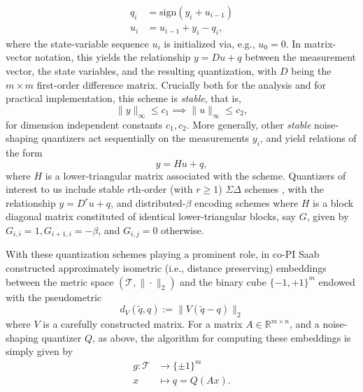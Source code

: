 \documentclass{article}
\newcommand{\R}{\mathbb{R}}
\newcommand{\sign}{\mathrm{sign}}
\begin{document}
\begin{align}
    q_i &= \sign(y_i+u_{i-1})\\
    u_i &= u_{i-1} + y_i -q_i,
\end{align}
where the state-variable sequence $u_i$ is initialized via, e.g., $u_0=0$. In matrix-vector notation, this yields the relationship $y=Du+q$  between the measurement vector, the state variables, and the resulting quantization, with $D$ being the $m\times m$ first-order difference matrix. Crucially both for the analysis and for practical implementation, this scheme is \emph{stable}, that is, $$\|y\|_\infty \leq c_1 \implies \|u\|_\infty \leq c_2,$$ for dimension independent constants $c_1,c_2$. More generally, other \emph{stable} noise-shaping quantizers act sequentially on the measurements $y_i$, %
and yield relations of the form 
$$ y=Hu + q,$$ where $H$ is a lower-triangular matrix associated with the scheme. Quantizers of interest to us include
stable $r$th-order (with $r\geq 1$) $\Sigma\Delta$ schemes  \cite{}, with the relationship $y=D^r u+q$, and distributed-$\beta$ encoding schemes \cite{} where $H$ is a block diagonal matrix constituted of identical lower-triangular blocks, say $G$, given by $G_{i,i}=1, G_{i+1,i}=-\beta$, and $G_{i,j}=0$ otherwise.

With these quantization schemes playing a prominent role, in  \cite{huynh2018fast} co-PI Saab  constructed approximately isometric (i.e., distance preserving) embeddings between the metric space  $(\mathcal{T}, \|\cdot\|_2)$ and the binary  cube $\{-1,+1\}^m$ endowed with the pseudometric
$$d_{{V}}(\tilde{q},q) := \| {V}(\tilde{q} -{q}) \|_2$$
where $V$ is a carefully constructed matrix.
For a  matrix $A\in\R^{m\times n}$, and a noise-shaping quantizer $Q$, as above, the algorithm for computing these embeddings is simply given by \begin{align}
g: \mathcal{T} &\to \{\pm 1\}^m\nonumber\\
x &\mapsto q=Q(Ax).\nonumber
\end{align}
\end{document}
